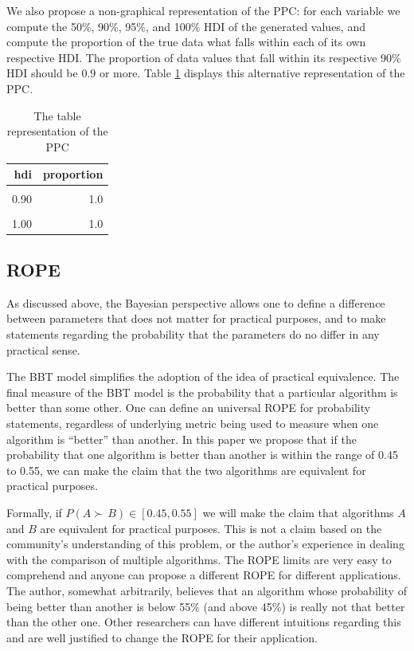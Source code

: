 \documentclass[twoside,11pt,preprint]{article}
\begin{document}
We also propose a non-graphical representation of the PPC: for each
variable we compute the 50\%, 90\%, 95\%, and 100\% HDI of the generated
values, and
compute the proportion of the true data what falls within each of its
own respective HDI. The proportion of data values that fall within
its respective 90\% HDI should be 0.9 or more. Table \ref{tab:ppc1}
displays this alternative representation of the PPC.

\begin{table}

\caption{\label{tab:xppc2}\label{tab:ppc1}The table representation of the PPC}
\centering
\begin{tabular}[t]{rr}
\toprule
\textbf{hdi} & \textbf{proportion}\\
\midrule
\cellcolor{gray!6}{0.50} & \cellcolor{gray!6}{0.8}\\
0.90 & 1.0\\
\cellcolor{gray!6}{0.95} & \cellcolor{gray!6}{1.0}\\
1.00 & 1.0\\
\bottomrule
\end{tabular}
\end{table}

\hypertarget{rope-1}{%
\subsection{\texorpdfstring{ROPE \label{sec:rope}}{ROPE }}\label{rope-1}}

As discussed above, the Bayesian perspective allows one to define a
difference between parameters that does not matter for practical
purposes, and to make statements regarding the probability that the
parameters do no differ in any practical sense.

The BBT model simplifies the adoption of the idea of practical
equivalence. The final measure of the BBT model is the probability
that a particular algorithm is better than some other. One can define
an universal ROPE for probability statements, regardless of underlying
metric being used to measure when one algorithm is ``better'' than
another. In this paper we propose that if the probability that one
algorithm is better than another is within the range of 0.45 to 0.55,
we can make the claim that the two algorithms are equivalent for
practical purposes.

Formally, if \(P(A \succ\,B) \in [0.45,0.55]\) we will make the claim
that algorithms \(A\) and \(B\) are equivalent for practical purposes.
This is not a claim based on the community's understanding of this
problem, or the author's experience in dealing with the comparison of
multiple algorithms. The ROPE limits are very easy to comprehend and
anyone can propose a different ROPE for different applications. The
author, somewhat arbitrarily, believes that an algorithm whose probability
of being better than another is below 55\% (and above 45\%) is really
not that better than the other one. Other researchers can have
different intuitions regarding this and are well justified to change
the ROPE for their application.
\end{document}
